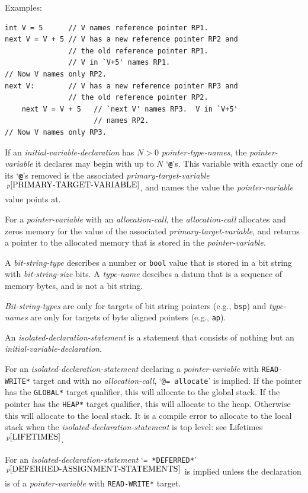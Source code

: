 \documentclass[12pt]{article}
\newcommand{\TT}[1]{{\tt \bfseries #1}}
\newcommand{\pagnote}[1]{$\,^{p\pageref{#1}}$}
\newcommand{\EOL}{\penalty \exhyphenpenalty}
\newenvironment{indpar}[1][0.3in]%
	{\begin{list}{}%
		     {\setlength{\itemsep}{0in}%
		      \setlength{\topsep}{0in}%
		      \setlength{\parsep}{1ex}%
		      \setlength{\labelwidth}{#1}%
		      \setlength{\leftmargin}{#1}%
		      \addtolength{\leftmargin}{\labelsep}}%
	 \item}%
	{\end{list}}
\begin{document}
\begin{indpar}
\begin{enumerate}
Examples:
\begin{indpar}\begin{verbatim}
int V = 5      // V names reference pointer RP1.
next V = V + 5 // V has a new reference pointer RP2 and
               // the old reference pointer RP1.
               // V in `V+5' names RP1.
// Now V names only RP2.
next V:        // V has a new reference pointer RP3 and
               // the old reference pointer RP2.
    next V = V + 5   // `next V' names RP3.  V in `V+5'
                     // names RP2.
// Now V names only RP3.
\end{verbatim}\end{indpar}
\item If an {\em initial-variable-declaration}
has $N>0$ {\em pointer-type-names}, the {\em pointer-vari\-able}
it declares may begin with up to $N$ `\TT{@}'s.  This variable with exactly
one of its `\TT{@}'s removed is the associated
{\em primary-target-variable}\pagnote{PRIMARY-TARGET-VARIABLE},
and names the value the {\em pointer-variable} value points at.
\item For a {\em pointer-variable} with an {\em allocation-call},
the {\em allocation-call} allocates and zeros memory for the value of the
associated {\em primary-target-variable},
and returns a pointer to the
allocated memory that is stored in the {\em pointer-variable}.
\item A {\em bit-string-type} describes a number or {\tt bool}
value that is stored in a bit string with {\em bit-string-size}
bits.  A {\em type-name} descibes a datum that is a sequence
of memory bytes, and is not a bit string.
\item {\em Bit-string-types} are only for targets of bit string pointers
(e.g., {\tt bsp}) and {\em type-names} are only for targets of byte aligned
pointers (e.g., {\tt ap}).
\item An {\em isolated-declaration-statement} is a statement that
consists of nothing but an {\em initial-variable-declaration}.
\item For an {\em isolated-declaration-statement} declaring a
{\em pointer-variable} with {\tt *READ-\EOL WRITE*} target and
with no {\em alloca\-tion-call}, `{\tt @= allocate}' is implied.
If the pointer has the {\tt *GLOBAL*} target qualifier, this will
allocate to the global stack.
If the pointer has the {\tt *HEAP*} target qualifier, this will
allocate to the heap.
Otherwise this will allocate to the local stack.
It is a compile error to allocate to the local stack when
the {\em isolated-declaration-statement} is top level:
see Lifetimes\pagnote{LIFETIMES}.
\item For an {\em isolated-declaration-statement}
`{\tt = *DEFERRED*}'\pagnote{DEFERRED-ASSIGNMENT-STATEMENTS}
is implied unless the declaration is of a
{\em pointer-variable} with {\tt *READ-WRITE*} target.
\end{enumerate}
\end{indpar}
\end{document}
